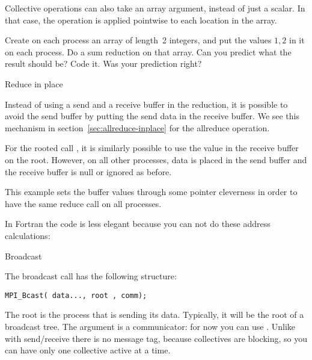 Collective operations can also take an array argument, instead of just a scalar.
In that case, the operation is applied pointwise to each location in the array.

\begin{exercise}
  \label{ex:randomcoord}
  Create on each process an array of length~2 integers, and put the
  values $1,2$ in it on each process. Do a sum reduction on that
  array. Can you predict what the result should be?  Code it. Was your
  prediction right?
\end{exercise}

 {Reduce in place}

Instead of using a send and a receive buffer in the reduction, it is
possible to avoid the send buffer by putting the send data in the
receive buffer. We see this mechanism
in section~\ref{sec:allreduce-inplace} for the allreduce operation.

For the rooted call , it is similarly
possible to use the value in the receive buffer on the root.
However, on all other processes, data is placed in the send buffer and
the receive buffer is null or ignored as before.

This example sets the buffer values through some pointer cleverness in
order to have the same reduce call on all processes.
%

In Fortran the code is less elegant because you can not do
these address calculations:
%

 {Broadcast}
\label{sec:bcast}

The broadcast call has the following structure:
\begin{verbatim}
MPI_Bcast( data..., root , comm);
\end{verbatim}
The root is the process that is sending its data.
Typically, it will be the root of a broadcast tree.
The  argument is a communicator:
for now you can use .
Unlike with send/receive there is no message tag,
because collectives are blocking, so you can have only one collective active at a
time. 

